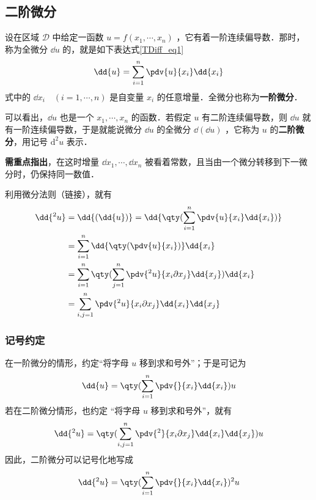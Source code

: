 \subsection{二阶微分}
设在区域 $\mathcal{D}$ 中给定一函数 $u=f(x_1,\cdots,x_n)$ ，它有着一阶连续偏导数．那时，称为全微分 $\dd{u}$ 的，就是如下表达式\autoref{TDiff_eq1}~
\begin{equation}
\dd{u}=\sum_{i=1}^n \pdv{u}{x_i}\dd{x_i}
\end{equation}
式中的 $\dd{x_i}\quad(i=1,\cdots,n)$ 是自变量 $x_i$ 的任意增量．全微分也称为\textbf{一阶微分}．

可以看出，$\dd{u}$ 也是一个 $x_1,\cdots,x_n$ 的函数．若假定 $u$ 有二阶连续偏导数，则 $\dd{u}$ 就有一阶连续偏导数，于是就能说微分 $\dd{u}$ 的全微分 $\dd{(\dd u)}$ ，它称为 $u$ 的\textbf{二阶微分}，用记号 $\mathrm{d}^2u$ 表示．

\textbf{需重点指出}，在这时增量 $\dd{x_1},\cdots,\dd{x_n}$ 被看着常数，且当由一个微分转移到下一微分时，仍保持同一数值．

利用微分法则（链接），就有
\begin{equation}
\begin{aligned}
\dd{^2u}&=\dd{(\dd{u})}=\dd{\qty(\sum_{i=1}^n \pdv{u}{x_i}\dd{x_i})}\\
&=\sum_{i=1}^n \dd{\qty(\pdv{u}{x_i})}\dd{x_i}\\
&=\sum_{i=1}^n\qty(\sum_{j=1}^n\pdv{^2u}{x_i\partial x_j} \dd{x_j})\dd{x_i}\\
&=\sum_{i,j=1}^n\pdv{^2u}{x_i\partial x_j} \dd{x_i}\dd{x_j}
\end{aligned}
\end{equation}
\subsubsection{记号约定}
在一阶微分的情形，约定“将字母 $u$ 移到求和号外”；于是可记为
\begin{equation}
\dd{u}=\qty(\sum_{i=1}^n\pdv{}{x_i}\dd{x_i})u
\end{equation}
若在二阶微分情形，也约定 “将字母 $u$ 移到求和号外”，就有
\begin{equation}
\dd{^2u}=\qty(\sum_{i,j=1}^n\pdv{^2}{x_i\partial x_j} \dd{x_i}\dd{x_j})u
\end{equation}
因此，二阶微分可以记号化地写成
\begin{equation}
\dd{^2u}=\qty(\sum_{i=1}^n\pdv{}{x_i} \dd{x_i})^2u
\end{equation}
